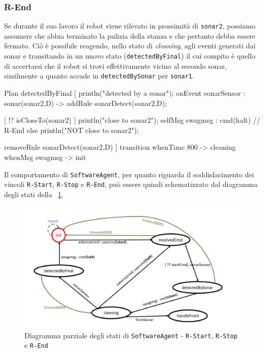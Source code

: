 \documentclass{../llncs}
\newcommand{\codescript}[1]{{\mbox{\small{\texttt{#1}}}}\xspace}
\newcommand{\code}[1]{{\color{blue}\small{\texttt{#1}}}}
\newcommand{\labelfig}[1]{\label{fig:#1}}
\newcommand{\xf}[1]{\figurename~\ref{fig:#1}}
\begin{document}
\subsubsection{R-End}
Se durante il suo lavoro il robot viene rilevato in prossimità di \code{sonar2}, possiamo assumere che abbia terminato la pulizia della stanza e che pertanto debba essere fermato. Ciò è possibile reagendo, nello stato di \emph{cleaning}, agli eventi generati dai sonar e transitando in un nuovo stato (\codescript{detectedByFinal}) il cui compito è quello di accertarsi che il robot si trovi effettivamente vicino al secondo sonar, similmente a quanto accade in \codescript{detectedBySonar} per \code{sonar1}.\\

\begin{qacode}[caption={SoftwareAgent, pt4}]
Plan detectedByFinal [
	println("detected by a sonar");
	onEvent sonarSensor : sonar(sonar2,D) -> addRule sonarDetect(sonar2,D);

	[ !? isCloseTo(sonar2) ] {
		println("close to sonar2");
		selfMsg swagmsg : cmd(halt) // R-End
	}
	else
		println("NOT close to sonar2");
	
	removeRule sonarDetect(sonar2,D)
]
transition
	whenTime 800 -> cleaning
	whenMsg swagmsg -> init
\end{qacode}

\vspace{16px}

Il comportamento di \texttt{SoftwareAgent}, per quanto riguarda il soddisfacimento dei vincoli \code{R-Start}, \code{R-Stop} e \code{R-End}, può essere quindi schematizzato dal diagramma degli stati della \xf{fsmStartStopEnd}.

\begin{figure}[!htb]
\centering
\includegraphics[scale=0.4]{img/stateDiagramStartStopEnd.png}
\caption{Diagramma parziale degli stati di \texttt{SoftwareAgent} - \code{R-Start}, \code{R-Stop} e \code{R-End}}\labelfig{fsmStartStopEnd}
\end{figure}
\end{document}
